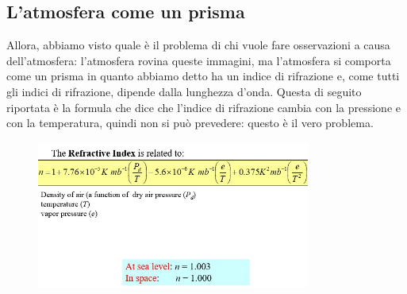 \documentclass[a4paper,11pt]{article}
\begin{document}
 \subsection{L'atmosfera come un prisma}
Allora, abbiamo visto quale è il problema di chi vuole fare osservazioni a causa dell’atmosfera: l’atmosfera rovina queste immagini, ma l’atmosfera si comporta come un prisma in quanto abbiamo detto ha un indice di rifrazione e, come tutti gli indici di rifrazione, dipende dalla lunghezza d’onda. Questa di seguito riportata è la formula che dice che l’indice di rifrazione cambia con la pressione e con la temperatura, quindi non si può prevedere: questo è il vero problema. 

\begin{figure}[h!!]
        \centering
        \includegraphics[width=9cm]{25.jpg}
        \label{}
    \end{figure}
\end{document}
